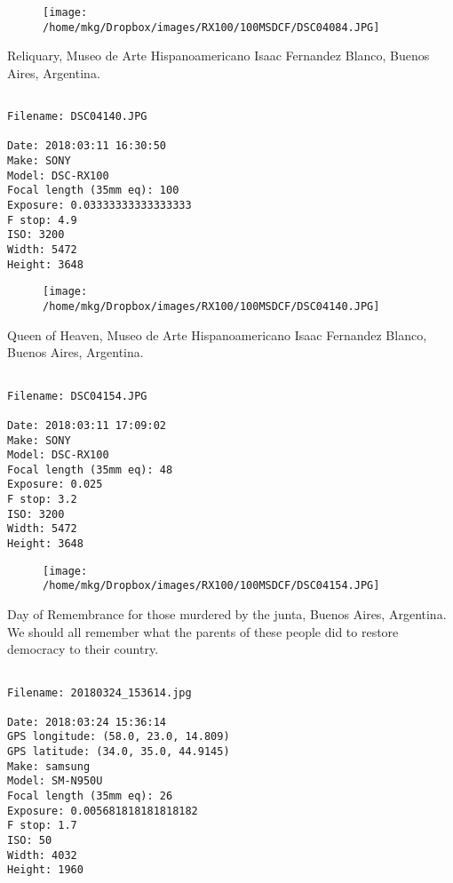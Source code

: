 \begin{figure}
\texttt{[image: /home/mkg/Dropbox/images/RX100/100MSDCF/DSC04084.JPG]}
\end{figure}
    
\clearpage
\onecolumn
\noindent Reliquary, Museo de Arte Hispanoamericano Isaac Fernandez Blanco, Buenos Aires, Argentina.
\noindent
\begin{lstlisting}

Filename: DSC04140.JPG

Date: 2018:03:11 16:30:50
Make: SONY
Model: DSC-RX100
Focal length (35mm eq): 100
Exposure: 0.03333333333333333
F stop: 4.9
ISO: 3200
Width: 5472
Height: 3648
\end{lstlisting}
\clearpage

\begin{figure}
\texttt{[image: /home/mkg/Dropbox/images/RX100/100MSDCF/DSC04140.JPG]}
\end{figure}
    
\clearpage
\onecolumn
\noindent Queen of Heaven, Museo de Arte Hispanoamericano Isaac Fernandez Blanco, Buenos Aires, Argentina.
\noindent
\begin{lstlisting}

Filename: DSC04154.JPG

Date: 2018:03:11 17:09:02
Make: SONY
Model: DSC-RX100
Focal length (35mm eq): 48
Exposure: 0.025
F stop: 3.2
ISO: 3200
Width: 5472
Height: 3648
\end{lstlisting}
\clearpage

\begin{figure}
\texttt{[image: /home/mkg/Dropbox/images/RX100/100MSDCF/DSC04154.JPG]}
\end{figure}
    
\clearpage
\onecolumn
\noindent Day of Remembrance for those murdered by the junta, Buenos Aires, Argentina. We should all remember what the parents of these people did to restore democracy to their country.
\noindent
\begin{lstlisting}

Filename: 20180324_153614.jpg

Date: 2018:03:24 15:36:14
GPS longitude: (58.0, 23.0, 14.809)
GPS latitude: (34.0, 35.0, 44.9145)
Make: samsung
Model: SM-N950U
Focal length (35mm eq): 26
Exposure: 0.005681818181818182
F stop: 1.7
ISO: 50
Width: 4032
Height: 1960
\end{lstlisting}
\clearpage

